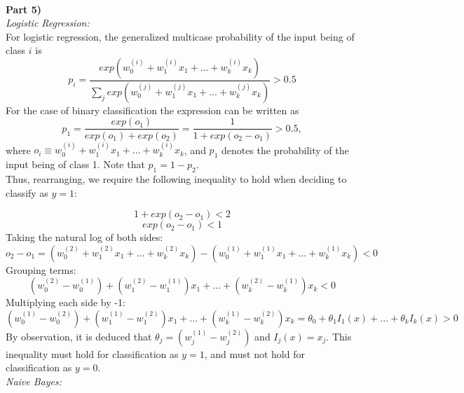 \documentclass{article}
\begin{document}
\\
\textbf{Part 5)}\\
\textit{Logistic Regression:}\\
For logistic regression, the generalized multicase probability of the input being of class $i$ is 
$$p_i=\frac{exp(w_0^{(i)}+w_1^{(i)}x_1+...+w_k^{(i)}x_k)}{\sum_jexp(w_0^{(j)}+w_1^{(j)}x_1+...+w_k^{(j)}x_k)}>0.5$$
For the case of binary classification the expression can be written as
$$p_1=\frac{exp(o_1)}{exp(o_1)+exp(o_2)}=\frac{1}{1+exp(o_2-o_1)}>0.5,$$
where $o_i\equiv w_0^{(i)}+w_1^{(i)}x_1+...+w_k^{(i)}x_k$, and $p_1$ denotes the probability of the input being of class 1. Note that $p_1=1-p_2$. \\

Thus, rearranging, we require the following inequality to hold when deciding to classify as $y=1$:

$$1+exp(o_2-o_1)<2$$
$$exp(o_2-o_1)<1$$
Taking the natural log of both sides:
$$o_2-o_1=(w_0^{(2)}+w_1^{(2)}x_1+...+w_k^{(2)}x_k)-(w_0^{(1)}+w_1^{(1)}x_1+...+w_k^{(1)}x_k)<0$$
Grouping terms:
$$(w_0^{(2)}-w_0^{(1)})+(w_1^{(2)}-w_1^{(1)})x_1+...+(w_k^{(2)}-w_k^{(1)})x_k<0$$
Multiplying each side by -1:
$$(w_0^{(1)}-w_0^{(2)})+(w_1^{(1)}-w_1^{(2)})x_1+...+(w_k^{(1)}-w_k^{(2)})x_k=\theta_0+\theta_1I_1(x)+...+\theta_k I_k(x)>0$$
By observation, it is deduced that $\theta_j=(w_j^{(1)}-w_j^{(2)})$ and $I_j(x)=x_j$. This inequality must hold for classification as $y=1$, and must not hold for classification as $y=0$.\\

\textit{Naive Bayes:}\\
\\\\\\\\\\\\\\\\\\\\\\\\\\\\\\\\\
\end{document}
